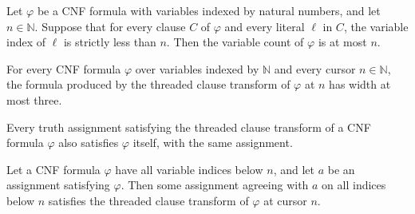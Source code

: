 \begin{lemma}
\label{Complexity.sat_numVars_le}
\leanok
{}
Let $\varphi$ be a CNF formula with variables indexed by natural numbers, and let
$n\in\mathbb{N}$. Suppose that for every clause $C$ of $\varphi$ and every literal
$\ell$ in $C$, the variable index of $\ell$ is strictly less than $n$. Then the variable
count of $\varphi$ is at most $n$.
\end{lemma}

\begin{lemma}
\label{Complexity.satTransformFrom_width}
\leanok
{}
For every CNF formula $\varphi$ over variables indexed by $\mathbb{N}$ and every cursor
$n \in \mathbb{N}$, the formula produced by the threaded clause transform of $\varphi$
at $n$ has width at most three.
\end{lemma}

\begin{lemma}
\label{Complexity.satTransformFrom_sound}
\leanok
{}
Every truth assignment satisfying the threaded clause transform of a CNF formula
$\varphi$ also satisfies $\varphi$ itself, with the same assignment.
\end{lemma}

\begin{lemma}
\label{Complexity.satTransformFrom_complete}
\leanok
{}
Let a CNF formula $\varphi$ have all variable indices below $n$, and let $a$ be an
assignment satisfying $\varphi$. Then some assignment agreeing with $a$ on all
indices below $n$ satisfies the threaded clause transform of $\varphi$ at cursor
$n$.
\end{lemma}

